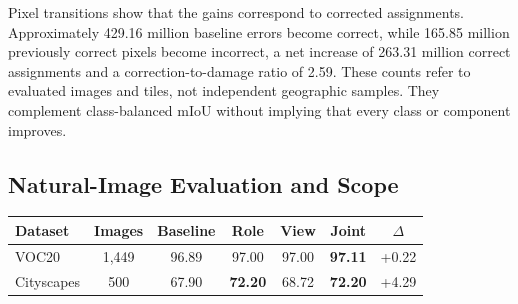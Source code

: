Pixel transitions show that the gains correspond to corrected assignments. Approximately 429.16 million baseline errors become correct, while 165.85 million previously correct pixels become incorrect, a net increase of 263.31 million correct assignments and a correction-to-damage ratio of 2.59. These counts refer to evaluated images and tiles, not independent geographic samples. They complement class-balanced mIoU without implying that every class or component improves.


\begin{center}
\setlength{\fboxsep}{0pt}
\captionsetup{hypcap=false}
\label{fig:qualitative-placeholder}
\captionsetup{hypcap=true}
\end{center}

\subsection{Natural-Image Evaluation and Scope}

\begin{center}
\centering
\captionsetup{hypcap=false}
\label{tab:natural}
\captionsetup{hypcap=true}
\small
\setlength{\tabcolsep}{3pt}
\begin{tabular}{lcccccc}
\toprule
Dataset & Images & Baseline & Role & View & Joint & $\Delta$ \\
\midrule
VOC20 & 1,449 & 96.89 & 97.00 & 97.00 & \textbf{97.11} & +0.22 \\
Cityscapes & 500 & 67.90 & \textbf{72.20} & 68.72 & \textbf{72.20} & +4.29 \\
\bottomrule
\end{tabular}
\end{center}

